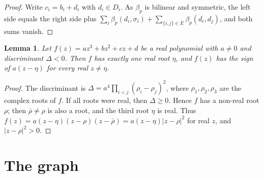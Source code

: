 \documentclass[11pt]{article}
\newtheorem{lemma}[theorem]{Lemma}
\begin{document}
\begin{proof}
Write $c_i=b_i+d_i$ with $d_i\in D_i$. As $\beta_p$ is bilinear and symmetric, the left side equals the right side plus $\sum_i\beta_p(d_i,\sigma_i)+\sum_{\{i,j\}\in E}\beta_p(d_i,d_j)$, and both sums vanish.
\end{proof}

\begin{lemma}\label{lem:cubic}
Let $f(z)=az^3+bz^2+cz+d$ be a real polynomial with $a\neq0$ and discriminant $\Delta<0$. Then $f$ has exactly one real root $\eta$, and $f(z)$ has the sign of $a(z-\eta)$ for every real $z\neq\eta$.
\end{lemma}

\begin{proof}
The discriminant is $\Delta=a^4\prod_{i<j}(\rho_i-\rho_j)^2$, where $\rho_1,\rho_2,\rho_3$ are the complex roots of $f$. If all roots were real, then $\Delta\geq0$. Hence $f$ has a non-real root $\rho$; then $\bar\rho\neq\rho$ is also a root, and the third root $\eta$ is real. Thus $f(z)=a(z-\eta)(z-\rho)(z-\bar\rho)=a(z-\eta)|z-\rho|^2$ for real $z$, and $|z-\rho|^2>0$.
\end{proof}

\section{The graph}
\end{document}
